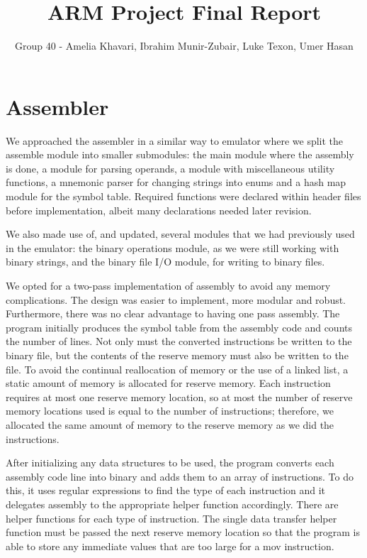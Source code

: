 \documentclass[11pt]{article}
\begin{document}
\title{ARM Project Final Report}
\author{Group 40 - Amelia Khavari, Ibrahim Munir-Zubair, Luke Texon, Umer Hasan}

\maketitle

\section{Assembler}
We approached the assembler in a similar way to emulator where we split the
assemble module into smaller submodules: the main module where the assembly is done,
a module for parsing operands, a module with miscellaneous utility functions,
a mnemonic parser for changing strings into enums and
a hash map module for the symbol table. Required functions were declared  within header files
before implementation, albeit many declarations needed later revision.

We also made use of, and updated, several modules that we had previously used in the emulator:
the binary operations module, as we were still working with binary strings,
and the binary file I/O module, for writing to binary files.

We opted for a two-pass implementation of assembly to avoid any memory complications. The design was easier to implement, more modular and robust. Furthermore, there was no clear advantage to having one pass assembly.
The program initially produces the symbol table from the assembly code and counts the number of lines.
Not only must the converted instructions be written to the binary file, but the contents of the reserve memory
must also be written to the file. To avoid the continual reallocation of memory or the use of a linked list,
a static amount of memory is allocated for reserve memory.
Each instruction requires at most one reserve memory location, so at most the number of
reserve memory locations used is equal to the number of instructions; therefore, we allocated the
same amount of memory to the reserve memory as we did the instructions.

After initializing any data structures to be used, the program converts each assembly
code line into binary and adds them to an array of instructions.
To do this, it uses regular expressions to find the type of each instruction and
it delegates assembly to the appropriate helper function accordingly.
There are helper functions for each type of instruction. The single data transfer helper function
must be passed the next reserve memory location
so that the program is able to store any immediate values that are too large for a mov instruction.
\end{document}
